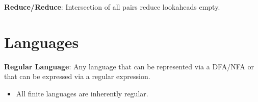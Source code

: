 \documentclass[10pt]{report}
\begin{document}
\begin{multicols}{2}
    \textbf{Reduce/Reduce}: Intersection of all pairs reduce lookaheads empty.
    
    \section*{Languages}
    
    \noindent
    \textbf{Regular Language}: Any language that can be represented via a DFA/NFA or that can be expressed via a regular expression.
    \begin{itemize}
      \item All finite languages are inherently regular.
    \end{itemize}
    
  \end{multicols}
\end{document}

